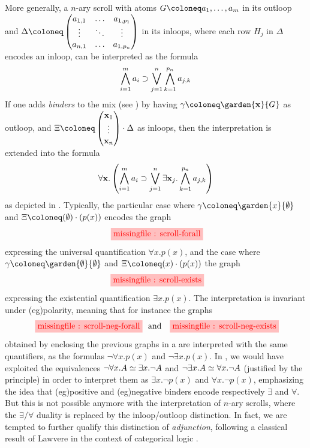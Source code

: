 \begin{scope}
More generally, a $n$-ary scroll with atoms $G \deq a_1, \ldots, a_m$ in its
outloop and $\Delta \deq \begin{pmatrix} a_{1,1} & \ldots & a_{1,p_1} \\
  \vdots & \ddots & \vdots \\
  a_{n,1} & \ldots & a_{1,p_n}
\end{pmatrix}$
in its inloops, where each row $H_j$ in $\Delta$ encodes an inloop, can be
interpreted as the formula
$$\bigwedge_{i = 1}^{m}{a_i} \supset \bigvee_{j = 1}^{n}\bigwedge_{k = 1}^{p_n}{a_{j,k}}$$
If one adds \emph{binders} to the mix (see ) by having $\gamma \deq
\garden{\bx}{G}$ as outloop, and
$\Xi \deq \begin{pmatrix}
  \bx_1 \\
  \vdots \\
  \bx_n
\end{pmatrix} \cdot \Delta$ as inloops, then the interpretation is extended into
the formula
$$\forall \mathbf{x}. \left(\bigwedge_{i = 1}^{m}{a_i} \supset \bigvee_{j = 1}^{n}\exists \mathbf{x}_j. \bigwedge_{k = 1}^{p_n}{a_{j,k}}\right)$$
as depicted in . Typically, the particular case where $\gamma
\deq \garden{x}{\emptyset}$ and $\Xi \deq (\emptyset) \cdot (p(x))$ encodes the graph
$$\stkfig{1}{scroll-forall}$$
expressing the universal quantification $\forall x. p(x)$, and the case where
$\gamma \deq \garden{\emptyset}{\emptyset}$ and $\Xi \deq (x) \cdot (p(x))$ the graph
$$\stkfig{1}{scroll-exists}$$
expressing the existential quantification $\exists x. p(x)$. The interpretation
is invariant under \kl(eg){polarity}, meaning that for instance the graphs
$$\stkfig{1}{scroll-neg-forall} \text{   and   } \stkfig{1}{scroll-neg-exists}$$
obtained by enclosing the previous graphs in a  are interpreted with the
same quantifiers, as the formulas $\neg \forall x. p(x)$ and $\neg \exists x.
p(x)$. In , we would have exploited the  equivalences
$\neg \forall x. A \simeq \exists x. \neg A$ and $\neg \exists x. A \simeq
\forall x. \neg A$ (justified by the  principle) in order to
interpret them as $\exists x. \neg p(x)$ and $\forall x. \neg p(x)$, emphasizing
the idea that \kl(eg){positive} and \kl(eg){negative} binders encode
respectively $\exists$ and $\forall$. But this is not possible anymore with the
 interpretation of $n$-ary scrolls, where the
$\exists/\forall$ duality is replaced by the inloop/outloop distinction. In
fact, we are tempted to further qualify this distinction of \emph{adjunction},
following a classical result of Lawvere in the context of categorical logic
.


\end{scope}
